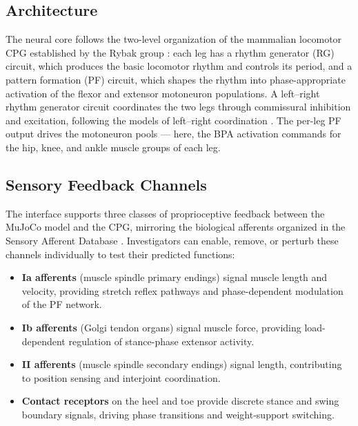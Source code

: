 \subsection{Architecture}

The neural core follows the two-level organization of the mammalian locomotor CPG established by the Rybak group \citep{rybak_modelling_2006, mccrea_organization_2008, rybak_organization_2015}: each leg has a rhythm generator (RG) circuit, which produces the basic locomotor rhythm and controls its period, and a pattern formation (PF) circuit, which shapes the rhythm into phase-appropriate activation of the flexor and extensor motoneuron populations. A left--right rhythm generator circuit coordinates the two legs through commissural inhibition and excitation, following the models of left--right coordination \citep{molkov_mechanisms_2015, danner_central_2016}. The per-leg PF output drives the motoneuron pools --- here, the BPA activation commands for the hip, knee, and ankle muscle groups of each leg.

\subsection{Sensory Feedback Channels}

The interface supports three classes of proprioceptive feedback between the MuJoCo model and the CPG, mirroring the biological afferents organized in the Sensory Afferent Database \citep{bolen_sensory_2023}. Investigators can enable, remove, or perturb these channels individually to test their predicted functions:

\begin{itemize}
    \item \textbf{Ia afferents} (muscle spindle primary endings) signal muscle length and velocity, providing stretch reflex pathways and phase-dependent modulation of the PF network.
    \item \textbf{Ib afferents} (Golgi tendon organs) signal muscle force, providing load-dependent regulation of stance-phase extensor activity.
    \item \textbf{II afferents} (muscle spindle secondary endings) signal length, contributing to position sensing and interjoint coordination.
    \item \textbf{Contact receptors} on the heel and toe provide discrete stance and swing boundary signals, driving phase transitions and weight-support switching.
\end{itemize}

